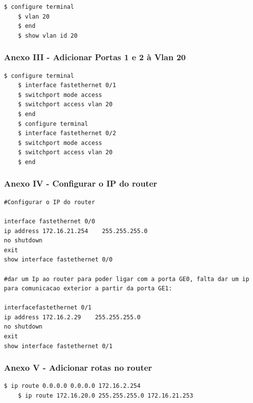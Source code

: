 \documentclass[11pt]{article}
\begin{document}
\begin{lstlisting}[style=bashStyle]
    $ configure terminal
    $ vlan 20
    $ end
    $ show vlan id 20
\end{lstlisting}

\bigskip

\subsubsection{Anexo III - Adicionar Portas 1 e 2 à Vlan 20}

\begin{lstlisting}[style=bashStyle]
    $ configure terminal
    $ interface fastethernet 0/1
    $ switchport mode access
    $ switchport access vlan 20
    $ end
    $ configure terminal
    $ interface fastethernet 0/2            
    $ switchport mode access
    $ switchport access vlan 20
    $ end
\end{lstlisting}

\bigskip

\subsubsection{Anexo IV - Configurar o IP do router}

\begin{lstlisting}[style=bashStyle]
#Configurar o IP do router

interface fastethernet 0/0                 
ip address 172.16.21.254    255.255.255.0   
no shutdown
exit
show interface fastethernet 0/0

#dar um Ip ao router para poder ligar com a porta GE0, falta dar um ip para comunicacao exterior a partir da porta GE1:

interfacefastethernet 0/1                 
ip address 172.16.2.29    255.255.255.0      
no shutdown
exit
show interface fastethernet 0/1  
\end{lstlisting}

\bigskip

\subsubsection{Anexo V - Adicionar rotas no router}

\begin{lstlisting}[style=bashStyle]
    $ ip route 0.0.0.0 0.0.0.0 172.16.2.254
    $ ip route 172.16.20.0 255.255.255.0 172.16.21.253
\end{lstlisting}
\end{document}
